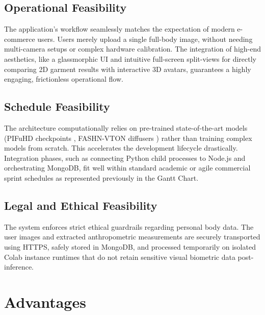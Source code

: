 \documentclass[12pt,a4paper,oneside]{report}
\begin{document}
\subsection{Operational Feasibility}
The application's workflow seamlessly matches the expectation of modern e-commerce users. Users merely upload a single full-body image, without needing multi-camera setups or complex hardware calibration. The integration of high-end aesthetics, like a glassmorphic UI and intuitive full-screen split-views for directly comparing 2D garment results with interactive 3D avatars, guarantees a highly engaging, frictionless operational flow.

\subsection{Schedule Feasibility}
The architecture computationally relies on pre-trained state-of-the-art models (PIFuHD checkpoints \cite{1}, FASHN-VTON diffusers \cite{16}) rather than training complex models from scratch. This accelerates the development lifecycle drastically. Integration phases, such as connecting Python child processes to Node.js and orchestrating MongoDB, fit well within standard academic or agile commercial sprint schedules as represented previously in the Gantt Chart.

\subsection{Legal and Ethical Feasibility}
The system enforces strict ethical guardrails regarding personal body data. The user images and extracted anthropometric measurements are securely transported using HTTPS, safely stored in MongoDB, and processed temporarily on isolated Colab instance runtimes that do not retain sensitive visual biometric data post-inference.
\section{Advantages}
\end{document}

